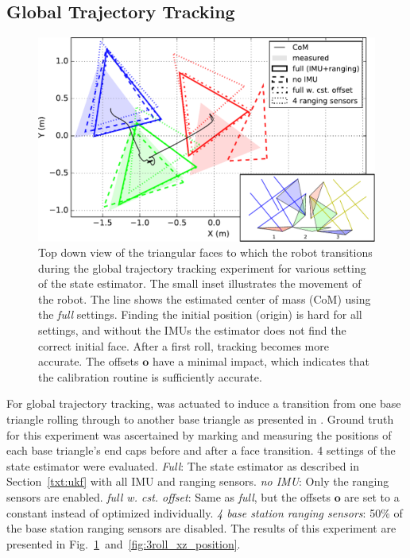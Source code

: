 {\subsection{Global Trajectory Tracking}
\begin{figure}[tpbh]
 \centering
  \includegraphics[width=\linewidth]{tex/img/top_view.pdf}
\caption{Top down view of the triangular faces to which the robot transitions during the global trajectory tracking experiment for various setting of the state estimator. The small inset illustrates the movement of the robot. The line shows the estimated center of mass (CoM) using the \emph{full} settings.
Finding the initial position (origin) is hard for all settings, and without the IMUs the estimator does not find the correct initial face.
After a first roll, tracking becomes more accurate. The offsets $\bm{o}$ have a minimal impact, which indicates that the calibration routine is sufficiently accurate.   }
\label{fig:3roll_triangles}
 \end{figure}
 
For global trajectory tracking, \SB{} was actuated to induce a transition from one base triangle rolling through to another base triangle as presented in \cite{sabelhaus2015system}.
Ground truth for this experiment was ascertained by marking and measuring the positions of each base triangle's end caps before and after a face transition.
4 settings of the state estimator were evaluated. \emph{Full}: The state estimator as described in Section~\ref{txt:ukf} with all IMU and ranging sensors. \emph{no IMU}: Only the ranging sensors are enabled. \emph{full w. cst. offset}: Same as \emph{full}, but the offsets $\bm{o}$ are set to a constant instead of optimized individually. \emph{4 base station ranging sensors}: 50\% of the base station ranging sensors are disabled. 
The results of this experiment are presented in Fig.~\ref{fig:3roll_triangles}~and~\ref{fig:3roll_xz_position}.
 
}
